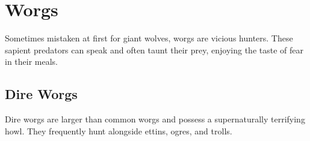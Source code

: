 \documentclass[letterpaper,openany,oneside,twocolumn]{book}
\begin{document}
\section*{Worgs}
{\entryfont Sometimes mistaken at first for giant wolves, worgs are vicious hunters. These sapient predators can speak and often taunt their prey, enjoying the taste of fear in their meals.}
\subsection*{Dire Worgs}
{\entryfont Dire worgs are larger than common worgs and possess a supernaturally terrifying howl. They frequently hunt alongside ettins, ogres, and trolls.}
\end{document}
